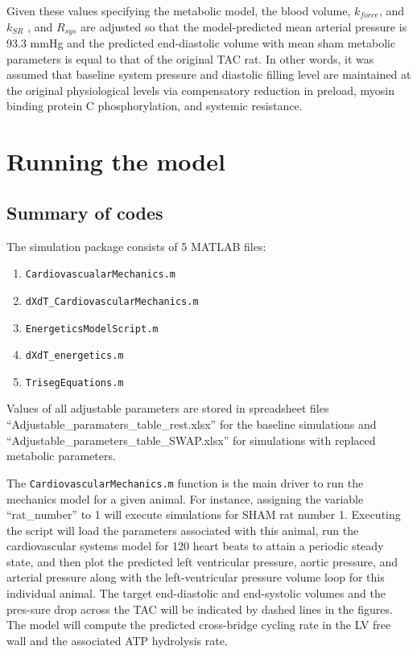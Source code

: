\documentclass[fleqn,10pt]{physiome}
\begin{document}
Given these values specifying the metabolic model, the blood volume, $k_{force}$, and $k_{SR}$ , and $R_{sys}$ are adjusted so that the model-predicted mean arterial pressure is 93.3 mmHg and the predicted end-diastolic volume with mean sham metabolic parameters is equal to that of the original TAC rat. In other words, it was assumed that baseline system pressure and diastolic filling level are maintained at the original physiological levels via compensatory reduction in preload, myosin binding protein C phosphorylation, and systemic resistance. 

\section{Running the model}

\subsection{Summary of codes}

The simulation package consists of 5 MATLAB files:
\begin{enumerate}
    \item \texttt{CardiovascualarMechanics.m}
    \item \texttt{dXdT\_CardiovascularMechanics.m}
    \item \texttt{EnergeticsModelScript.m}
    \item \texttt{dXdT\_energetics.m}
    \item \texttt{TrisegEquations.m}
\end{enumerate}

Values of all adjustable parameters are stored in spreadsheet files ``Adjustable\_paramaters\_table\_rest.xlsx'' for the baseline simulations and ``Adjustable\_parameters\_table\_SWAP.xlsx'' for simulations with replaced metabolic parameters.

The \texttt{CardiovascularMechanics.m} function is the main driver to run the mechanics model for a given animal. For instance, assigning the variable ``rat\_number'' to 1 will execute simulations for SHAM rat number 1. Executing the script will load the parameters associated with this animal, run the cardiovascular systems model for 120 heart beats to attain a periodic steady state, and then plot the predicted left ventricular pressure, aortic pressure, and arterial pressure along with the left-ventricular pressure volume loop for this individual animal. The target end-diastolic and end-systolic volumes and the pres-sure drop across the TAC will be indicated by dashed lines in the figures. The model will compute the predicted cross-bridge cycling rate in the LV free wall and the associated ATP hydrolysis rate.
\end{document}

